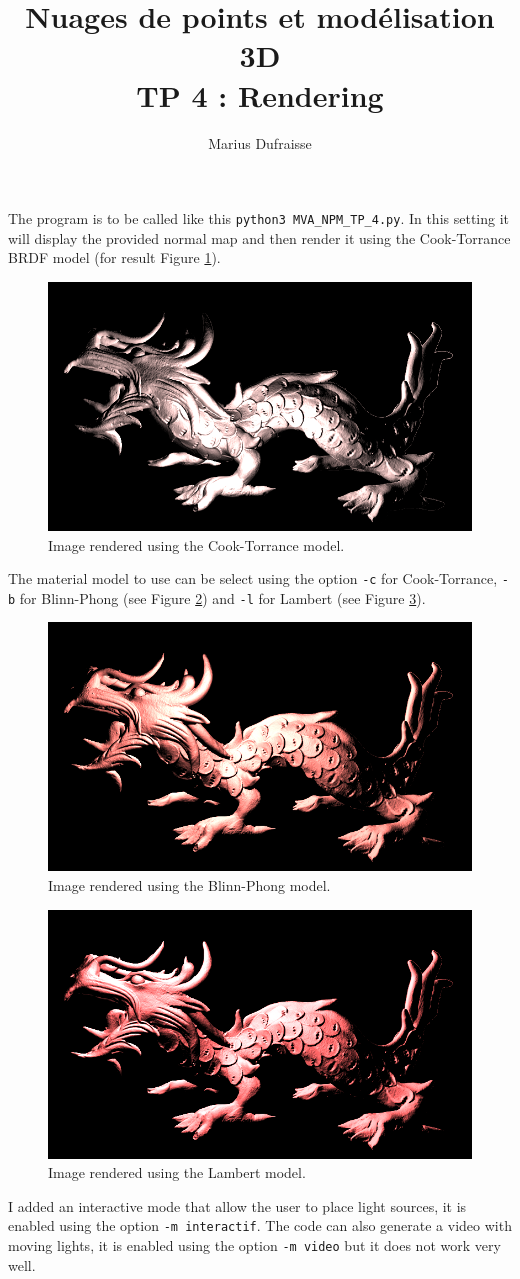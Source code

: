 \documentclass[french]{article}
\begin{document}
\title{Nuages de points et modélisation 3D\\
TP 4 : Rendering}
\author{Marius Dufraisse}
\date{}

\maketitle

The program is to be called like this \texttt{python3 MVA\_{}NPM\_{}TP\_{}4.py}. In this setting it will display the provided normal map and then render it using the Cook-Torrance BRDF model (for result Figure \ref{fig:cook}).

\begin{figure}[h]
	\centering
	\includegraphics[width=0.6\linewidth]{render-cook.png}
	\caption{Image rendered using the Cook-Torrance model.}
	\label{fig:cook}
\end{figure}

The material model to use can be select using the option \texttt{-c} for Cook-Torrance, \texttt{-b} for Blinn-Phong (see Figure \ref{fig:blinn}) and \texttt{-l} for Lambert (see Figure \ref{fig:lambert}).

\begin{figure}[h]
	\centering
	\includegraphics[width=0.6\linewidth]{render-blinn.png}
	\caption{Image rendered using the Blinn-Phong model.}
	\label{fig:blinn}
\end{figure}

\begin{figure}[h]
	\centering
	\includegraphics[width=0.6\linewidth]{render-lambert.png}
	\caption{Image rendered using the Lambert model.}
	\label{fig:lambert}
\end{figure}

I added an interactive mode that allow the user to place light sources, it is enabled using the option \texttt{-m interactif}. The code can also generate a video with moving lights, it is enabled using the option \texttt{-m video} but it does not work very well.
\end{document}
